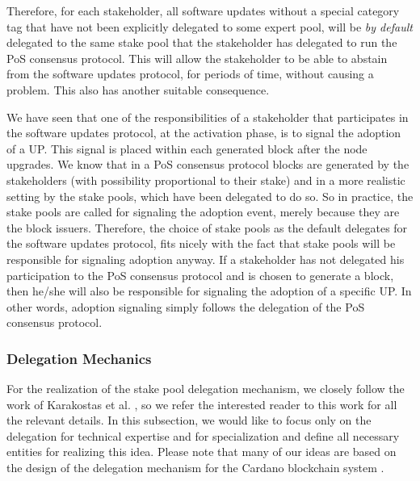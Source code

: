 Therefore, for each stakeholder, all software updates without a special category tag that have not been explicitly delegated to some expert pool, will be \emph{by default} delegated to the same stake pool that the stakeholder has delegated to run the  PoS consensus protocol. This will allow the stakeholder to be able to abstain from the software updates protocol, for periods of time, without causing a problem. This also has another suitable consequence.

We have seen that one of the responsibilities of a stakeholder that participates in the software updates protocol, at the activation phase, is to signal the adoption of a UP. This signal is placed within each generated block after the node upgrades. We know that in a PoS consensus protocol blocks are generated by the stakeholders (with possibility proportional to their stake) and in a more realistic setting by the stake pools, which have been delegated to do so. So in practice, the stake pools are called for signaling the adoption event, merely because they are the block issuers. Therefore, the choice of stake pools as the default delegates for the software updates protocol, fits nicely with the fact that stake pools will be responsible for signaling adoption anyway. If a stakeholder has not delegated his participation to the PoS consensus protocol and is chosen to generate a block, then he/she will also be responsible for signaling the adoption of a specific UP. In other words, adoption signaling simply follows the delegation of the PoS consensus protocol.

\subsubsection{Delegation Mechanics}
For the realization of the stake pool delegation mechanism, we closely follow the work of Karakostas et al. \cite{stakepools}, so we refer the interested reader to this work for all the relevant details. In this subsection, we would like to focus only on the delegation for technical expertise and for specialization and define all necessary entities for realizing this idea. Please note that many of our ideas are based on the design of the delegation mechanism for the Cardano blockchain system \cite{deldesign}.

